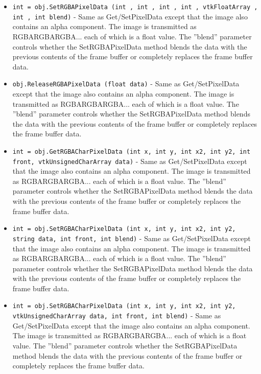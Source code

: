 \begin{itemize}
\item  \verb|int = obj.SetRGBAPixelData (int , int , int , int , vtkFloatArray , int , int blend)| -  Same as Get/SetPixelData except that the image also contains an alpha
 component. The image is transmitted as RGBARGBARGBA... each of which is a
 float value. The ''blend'' parameter controls whether the SetRGBAPixelData
 method blends the data with the previous contents of the frame buffer
 or completely replaces the frame buffer data.

\item  \verb|obj.ReleaseRGBAPixelData (float data)| -  Same as Get/SetPixelData except that the image also contains an alpha
 component. The image is transmitted as RGBARGBARGBA... each of which is a
 float value. The ''blend'' parameter controls whether the SetRGBAPixelData
 method blends the data with the previous contents of the frame buffer
 or completely replaces the frame buffer data.

\item  \verb|int = obj.GetRGBACharPixelData (int x, int y, int x2, int y2, int front, vtkUnsignedCharArray data)| -  Same as Get/SetPixelData except that the image also contains an alpha
 component. The image is transmitted as RGBARGBARGBA... each of which is a
 float value. The ''blend'' parameter controls whether the SetRGBAPixelData
 method blends the data with the previous contents of the frame buffer
 or completely replaces the frame buffer data.

\item  \verb|int = obj.SetRGBACharPixelData (int x, int y, int x2, int y2, string data, int front, int blend)| -  Same as Get/SetPixelData except that the image also contains an alpha
 component. The image is transmitted as RGBARGBARGBA... each of which is a
 float value. The ''blend'' parameter controls whether the SetRGBAPixelData
 method blends the data with the previous contents of the frame buffer
 or completely replaces the frame buffer data.

\item  \verb|int = obj.SetRGBACharPixelData (int x, int y, int x2, int y2, vtkUnsignedCharArray data, int front, int blend)| -  Same as Get/SetPixelData except that the image also contains an alpha
 component. The image is transmitted as RGBARGBARGBA... each of which is a
 float value. The ''blend'' parameter controls whether the SetRGBAPixelData
 method blends the data with the previous contents of the frame buffer
 or completely replaces the frame buffer data.


\end{itemize}
